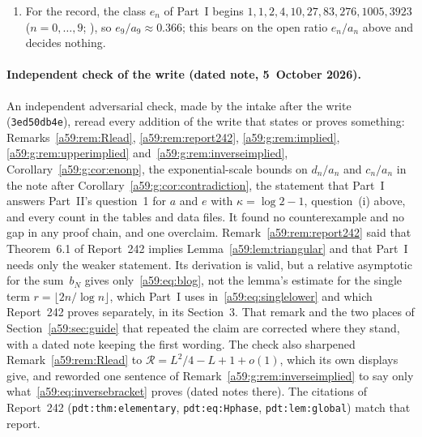 \documentclass[11pt,letterpaper]{article}
\theoremstyle{remark}\newtheorem{remark}[theorem]{Remark}
\theoremstyle{remark}\newtheorem{wremark}{Remark}\renewcommand{\thewremark}{W\arabic{wremark}}
\theoremstyle{plain}\newtheorem{wcorollary}[wremark]{Corollary}
\begin{document}
\begin{enumerate}[label=(\roman*)]
[Dated note, 5 October 2026: an independent recount made by the intake
after the write reproduces every entry of the table and extends
$d_n\le b_n$ to $n\le26$: for $n\le20$ by its own dynamic programs, and for
$21\le n\le26$ from the OEIS terms of A202060 and A098569 (with
$b_n=\mathrm{A098569}(n-1)$). The ratio $d_n/b_n$ keeps falling, to
$0.9268$ at $n=20$ and $0.8192$ at $n=26$, while $a_n>b_n$ for
$5\le n\le20$, with $a_{20}/b_{20}\approx8.71$. Still data only; see the
end of this section.]
\item For the record, the class $e_n$ of Part~I begins
$1,1,2,4,10,27,83,276,1005,3923$ ($n=0,\dots,9$;
), so $e_9/a_9\approx0.366$; this bears on
the open ratio $e_n/a_n$ above and decides nothing.
\end{enumerate}

\paragraph{Independent check of the write (dated note, 5~October 2026).}
An independent adversarial check, made by the intake after the write
(\texttt{3ed50db4e}), reread every addition of the write that states or
proves something: Remarks~\ref{a59:rem:Rlead}, \ref{a59:rem:report242},
\ref{a59:g:rem:implied}, \ref{a59:g:rem:upperimplied}
and~\ref{a59:g:rem:inverseimplied}, Corollary~\ref{a59:g:cor:enonp}, the
exponential-scale bounds on $d_n/a_n$ and $c_n/a_n$ in the note after
Corollary~\ref{a59:g:cor:contradiction}, the statement that Part~I answers
Part~II's question~1 for $a$ and $e$ with $\kappa=\log2-1$, question~(i)
above, and every count in the tables and data files. It found no
counterexample and no gap in any proof chain, and one overclaim.
Remark~\ref{a59:rem:report242} said that Theorem~6.1 of Report~242 implies
Lemma~\ref{a59:lem:triangular} and that Part~I needs only the weaker
statement. Its derivation is valid, but a relative asymptotic for the
sum~$b_N$ gives only~\eqref{a59:eq:blog}, not the lemma's estimate for the
single term $r=\lfloor2n/\log n\rfloor$, which Part~I uses
in~\eqref{a59:eq:singlelower} and which Report~242 proves separately, in
its Section~3. That remark and the two places of
Section~\ref{a59:sec:guide} that repeated the claim are corrected where they
stand, with a dated note keeping the first wording. The check also sharpened
Remark~\ref{a59:rem:Rlead} to $\mathcal R=L^2/4-L+1+o(1)$, which its own
displays give, and reworded one sentence of
Remark~\ref{a59:g:rem:inverseimplied} to say only
what~\eqref{a59:eq:inversebracket} proves (dated notes there). The citations
of Report~242 (\texttt{pdt:thm:elementary}, \texttt{pdt:eq:Hphase},
\texttt{pdt:lem:global}) match that report.
\end{document}

